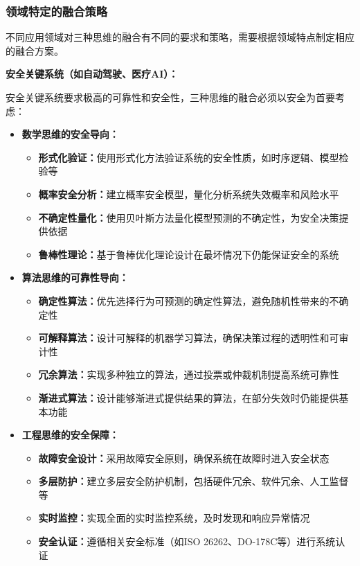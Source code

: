 \subsubsection{领域特定的融合策略}

不同应用领域对三种思维的融合有不同的要求和策略，需要根据领域特点制定相应的融合方案。

\textbf{安全关键系统（如自动驾驶、医疗AI）：}

安全关键系统要求极高的可靠性和安全性，三种思维的融合必须以安全为首要考虑：

\begin{itemize}
\item \textbf{数学思维的安全导向：}
\begin{itemize}
\item \textbf{形式化验证：}使用形式化方法验证系统的安全性质，如时序逻辑、模型检验等
\item \textbf{概率安全分析：}建立概率安全模型，量化分析系统失效概率和风险水平
\item \textbf{不确定性量化：}使用贝叶斯方法量化模型预测的不确定性，为安全决策提供依据
\item \textbf{鲁棒性理论：}基于鲁棒优化理论设计在最坏情况下仍能保证安全的系统
\end{itemize}

\item \textbf{算法思维的可靠性导向：}
\begin{itemize}
\item \textbf{确定性算法：}优先选择行为可预测的确定性算法，避免随机性带来的不确定性
\item \textbf{可解释算法：}设计可解释的机器学习算法，确保决策过程的透明性和可审计性
\item \textbf{冗余算法：}实现多种独立的算法，通过投票或仲裁机制提高系统可靠性
\item \textbf{渐进式算法：}设计能够渐进式提供结果的算法，在部分失效时仍能提供基本功能
\end{itemize}

\item \textbf{工程思维的安全保障：}
\begin{itemize}
\item \textbf{故障安全设计：}采用故障安全原则，确保系统在故障时进入安全状态
\item \textbf{多层防护：}建立多层安全防护机制，包括硬件冗余、软件冗余、人工监督等
\item \textbf{实时监控：}实现全面的实时监控系统，及时发现和响应异常情况
\item \textbf{安全认证：}遵循相关安全标准（如ISO 26262、DO-178C等）进行系统认证
\end{itemize}
\end{itemize}

